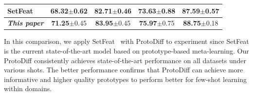 \begin{table}
{\begin{tabular}{lcccc}
SetFeat~\cite{afrasiyabi2022matching} & 68.32\textcolor{mygray}{\scriptsize{$\pm$0.62}} & 82.71\textcolor{mygray}{\scriptsize{$\pm$0.46}} & {73.63}\textcolor{mygray}{\scriptsize{$\pm$0.88}} & {87.59}\textcolor{mygray}{\scriptsize{$\pm$0.57}} \\
\midrule
\rowcolor{softblue}
{\textbf{\textit{This paper}}} & \textbf{71.25}\textcolor{mygray}{\scriptsize{$\pm$0.45}} & \textbf{83.95}\textcolor{mygray}{\scriptsize{$\pm$0.45}} & \textbf{75.97}\textcolor{mygray}{\scriptsize{$\pm$0.75}} &  \textbf{88.75}\textcolor{mygray}{\scriptsize{$\pm$0.18}}
\\

\bottomrule
\end{tabular}}
\vspace{-3mm}
\label{tab:main}
\end{table}
In this comparison, we apply SetFeat~\cite{afrasiyabi2022matching} with ProtoDiff to experiment since SetFeat is the current state-of-the-art model based on prototype-based meta-learning. Our ProtoDiff consistently achieves state-of-the-art performance on all datasets under various shots.
The better performance confirms that ProtoDiff can achieve more informative and higher quality prototypes to perform better for few-shot learning within domains.


 

